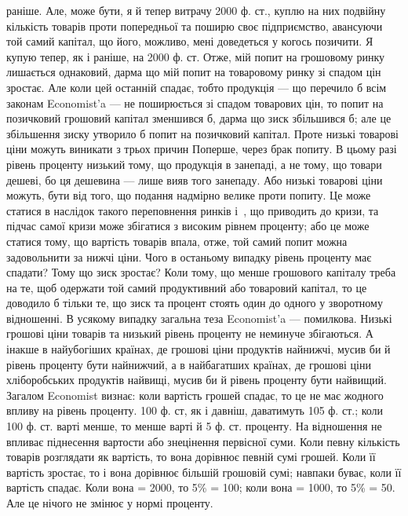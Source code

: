 \parcont{}  %
раніше. Але, може бути, я й тепер витрачу 2000 ф. ст., куплю на них подвійну
кількість товарів проти попередньої та поширю своє підприємство, авансуючи
той самий капітал, що його, можливо, мені доведеться у когось позичити. Я купую
тепер, як і раніше, на 2000 ф. ст. Отже, мій попит на грошовому ринку лишається
однаковий, дарма що мій попит на товаровому ринку зі спадом цін зростає.
Але коли цей останній спадає, тобто продукція — що перечило б всім законам
Economist'a — не поширюється зі спадом товарових цін, то попит на
позичковий грошовий капітал зменшився б, дарма що зиск збільшився б; але
це збільшення зиску утворило б попит на позичковий капітал. Проте низькі
товарові ціни можуть виникати з трьох причин Поперше, через брак попиту.
В цьому разі рівень проценту низький тому, що продукція в занепаді, а не
тому, що товари дешеві, бо ця дешевина — лише вияв того занепаду. Або
низькі товарові ціни можуть, бути від того, що подання надмірно велике проти
попиту. Це може статися в наслідок такого переповнення ринків і~,
що приводить до кризи, та підчас самої кризи може збігатися з високим рівнем
проценту; або це може статися тому, що вартість товарів впала, отже, той
самий попит можна задовольнити за нижчі ціни. Чого в останьому випадку рівень
проценту має спадати? Тому що зиск зростає? Коли тому, що менше грошового
капіталу треба на те, щоб одержати той самий продуктивний або товаровий
капітал, то це доводило б тільки те, що зиск та процент стоять один до одного
у зворотному відношенні. В усякому випадку загальна теза Economist’a — помилкова.
Низькі грошові ціни товарів та низький рівень проценту не неминуче збігаються.
А інакше в найубогіших країнах, де грошові ціни продуктів найнижчі,
мусив би й рівень проценту бути найнижчий, а в найбагатших країнах, де
грошові ціни хліборобських продуктів найвищі, мусив би й рівень проценту
бути найвищий. Загалом Economist визнає: коли вартість грошей спадає, то це
не має жодного впливу на рівень проценту. 100 ф. ст, як і давніш, даватимуть
105 ф. ст.; коли 100 ф. ст. варті менше, то менше варті й 5 ф. ст. проценту.
На відношення не впливає піднесення вартости або знецінення первісної суми.
Коли певну кількість товарів розглядати як вартість, то вона дорівнює певній
сумі грошей. Коли її вартість зростає, то і вона дорівнює більшій грошовій
сумі; навпаки буває, коли її вартість спадає. Коли вона = 2000, то 5\% =
100; коли вона = 1000, то 5\% = 50. Але це нічого не змінює у нормі проценту.
